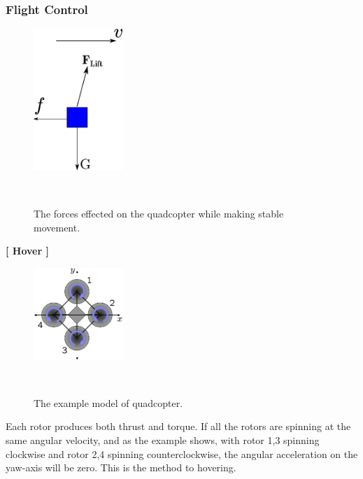 \subsubsection{Flight Control}
\begin{figure}[h!]

  \centering
    \includegraphics[width=0.3\textwidth]{../Pictures/flying.eps}
    \caption{The forces effected on the quadcopter while making stable movement.}\\
\end{figure}
\textbf{[ Hover ]}
\begin{figure}[H]

  \centering
    \includegraphics[width=0.3\textwidth]{../Pictures/Quadrotor_yaw_torque.png}
    \caption{The example model of quadcopter.}\\
\end{figure}


Each rotor produces both thrust and torque. If all the rotors are spinning at the same angular velocity, and as the example shows, with rotor 1,3 spinning clockwise and rotor 2,4 spinning counterclockwise, the angular acceleration on the yaw-axis will be zero.
This is the method to hovering.

